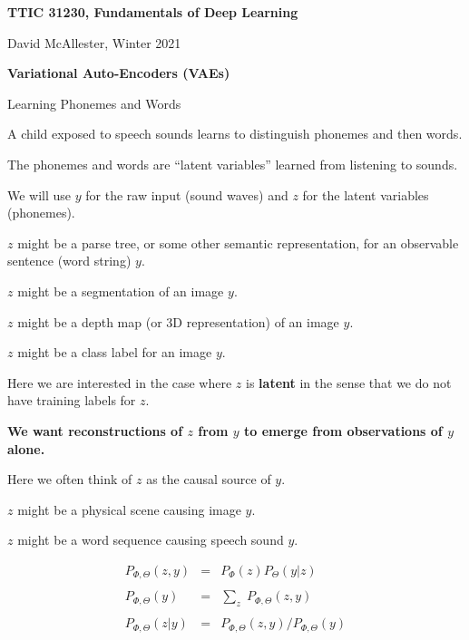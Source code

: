 




{\Huge

  \centerline{\bf TTIC 31230, Fundamentals of Deep Learning}
  \bigskip
  \centerline{David McAllester, Winter 2021}
  \vfill
  \vfill
  \centerline{\bf Variational Auto-Encoders (VAEs)}
  \vfill
  \vfill

{Learning Phonemes and Words}

A child exposed to speech sounds learns to distinguish phonemes and then words.

\vfill
The phonemes and words are ``latent variables'' learned from listening to sounds.

\vfill
We will use $y$ for the raw input (sound waves) and $z$ for the latent variables (phonemes).


$z$ might be a parse tree, or some other semantic representation, for an observable sentence (word string) $y$.

\vfill
$z$ might be a segmentation of an image $y$.

\vfill
$z$ might be a depth map (or 3D representation) of an image $y$.

\vfill
$z$ might be a class label for an image $y$.

\vfill
Here we are interested in the case where $z$ is {\bf latent} in the sense that we do not have training labels for $z$.

\vfill
{\bf We want reconstructions of $z$ from $y$ to emerge from observations of $y$ alone.}


Here we often think of $z$ as the causal source of $y$.

\vfill
$z$ might be a physical scene causing image $y$.

\vfill
$z$ might be a word sequence causing speech sound $y$.


\begin{eqnarray*}
P_{\Phi,\Theta}(z,y) & = & P_\Phi(z)P_\Theta(y|z) \\
\\
P_{\Phi,\Theta}(y) & = & \sum_z\; P_{\Phi,\Theta}(z,y) \\
\\
P_{\Phi,\Theta}(z|y) & = & P_{\Phi,\Theta}(z,y)/P_{\Phi,\Theta}(y)
\end{eqnarray*}

}
